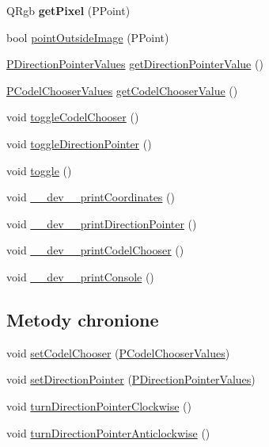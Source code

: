 \begin{CompactItemize}
\item 
\hypertarget{classPCodePointer_e9f3396a98b84d090e820ad37c6dca21}{
QRgb \textbf{getPixel} (PPoint)}
\label{classPCodePointer_e9f3396a98b84d090e820ad37c6dca21}

\item 
bool \hyperlink{classPCodePointer_a9e836354b61f96ed39208c8b37d57d3}{pointOutsideImage} (PPoint)
\item 
\hyperlink{penums_8h_6d3256570150238c718cbbb5f81c82df}{PDirectionPointerValues} \hyperlink{classPCodePointer_e0461a3d72af876b5b3c838a8b45a729}{getDirectionPointerValue} ()
\item 
\hyperlink{penums_8h_59dc57d526e2ce263bdf851c0d4fef3e}{PCodelChooserValues} \hyperlink{classPCodePointer_529b0f2f65c1d17082d755813fec0194}{getCodelChooserValue} ()
\item 
void \hyperlink{classPCodePointer_56d2ef632779fbe64937030e82b027d1}{toggleCodelChooser} ()
\item 
void \hyperlink{classPCodePointer_4aab1f30e01bb0fb3d78b5e6aa93535c}{toggleDirectionPointer} ()
\item 
void \hyperlink{classPCodePointer_5b34ab0f6bb3ddb3bd7e44a7d9a613ca}{toggle} ()
\item 
void \hyperlink{classPCodePointer_ce0986ca3dc000a06a0155d20cd83d26}{\_\-\_\-dev\_\-\_\-printCoordinates} ()
\item 
void \hyperlink{classPCodePointer_103c79ebd3257261d5c72322bc4eb742}{\_\-\_\-dev\_\-\_\-printDirectionPointer} ()
\item 
void \hyperlink{classPCodePointer_21810c2cdb66ea83cabafde33e8a0206}{\_\-\_\-dev\_\-\_\-printCodelChooser} ()
\item 
void \hyperlink{classPCodePointer_fe765c0487ab59dbbbdd47b78842bbcb}{\_\-\_\-dev\_\-\_\-printConsole} ()
\end{CompactItemize}
\subsection*{Metody chronione}
\begin{CompactItemize}
\item 
void \hyperlink{classPCodePointer_b5c13bf294dddd672ca9fe7675eb258b}{setCodelChooser} (\hyperlink{penums_8h_59dc57d526e2ce263bdf851c0d4fef3e}{PCodelChooserValues})
\item 
void \hyperlink{classPCodePointer_0b97bd6b4383e976e54c5738178c7815}{setDirectionPointer} (\hyperlink{penums_8h_6d3256570150238c718cbbb5f81c82df}{PDirectionPointerValues})
\item 
void \hyperlink{classPCodePointer_a3ad29e6327d54faf0b081892e720aca}{turnDirectionPointerClockwise} ()
\item 
void \hyperlink{classPCodePointer_3f43e8205a0554bf7baa3821e01ab4a2}{turnDirectionPointerAnticlockwise} ()
\end{CompactItemize}
